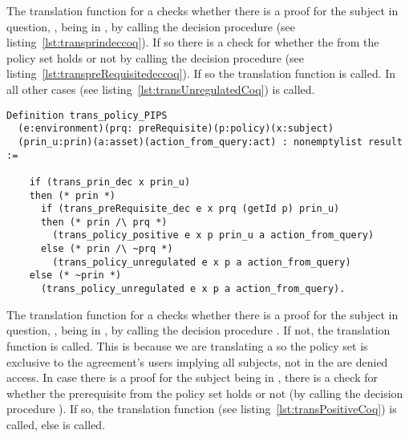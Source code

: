 The  translation function for a  checks whether there is a proof for the subject in question, , being in , by calling the decision procedure  (see listing~\ref{lst:transprindeccoq}). If so there is a check for whether the  from the policy set holds or not by calling the decision procedure  (see listing~\ref{lst:transpreRequisitedeccoq}). If so the translation function  is called. In all other cases  (see listing~\ref{lst:transUnregulatedCoq}) is called.

\begin{minipage}[c]{0.95\textwidth}
\begin{lstlisting}
Definition trans_policy_PIPS
  (e:environment)(prq: preRequisite)(p:policy)(x:subject)
  (prin_u:prin)(a:asset)(action_from_query:act) : nonemptylist result :=
  
    if (trans_prin_dec x prin_u)
    then (* prin *)
      if (trans_preRequisite_dec e x prq (getId p) prin_u)
      then (* prin /\ prq *)
        (trans_policy_positive e x p prin_u a action_from_query)                           
      else (* prin /\ ~prq *)
        (trans_policy_unregulated e x p a action_from_query)
    else (* ~prin *)
      (trans_policy_unregulated e x p a action_from_query).
\end{lstlisting}
\end{minipage}


The  translation function for a  checks whether there is a proof for the subject in question, , being in , by calling the decision procedure . If not, the translation function  is called. This is because we are translating a  so the policy set is exclusive to the agreement's users implying all subjects, not in the  are denied access. In case there is a proof for the subject  being in , there is a check for whether the prerequisite from the policy set holds or not (by calling the decision procedure ). If so, the translation function  (see listing~\ref{lst:transPositiveCoq}) is called, else  is called.

